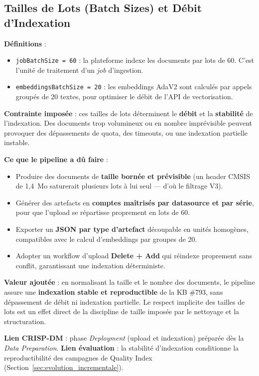 \documentclass[12pt,a4paper]{report}
\begin{document}
\subsection{Tailles de Lots (Batch Sizes) et Débit d'Indexation}
\label{sec:batch_sizes}

\textbf{Définitions} :
\begin{itemize}
  \item \texttt{jobBatchSize = 60} : la plateforme indexe les documents par lots de 60. C'est l'unité de traitement d'un \textit{job} d'ingestion.
  \item \texttt{embeddingsBatchSize = 20} : les embeddings AdaV2 sont calculés par appels groupés de 20 textes, pour optimiser le débit de l'API de vectorisation.
\end{itemize}

\textbf{Contrainte imposée} : ces tailles de lots déterminent le \textbf{débit} et la \textbf{stabilité} de l'indexation. Des documents trop volumineux ou en nombre imprévisible peuvent provoquer des dépassements de quota, des timeouts, ou une indexation partielle instable.

\textbf{Ce que le pipeline a dû faire} :
\begin{itemize}
  \item Produire des documents de \textbf{taille bornée et prévisible} (un header CMSIS de 1,4~Mo saturerait plusieurs lots à lui seul --- d'où le filtrage V3).
  \item Générer des artefacts en \textbf{comptes maîtrisés par datasource et par série}, pour que l'upload se répartisse proprement en lots de 60.
  \item Exporter un \textbf{JSON par type d'artefact} découpable en unités homogènes, compatibles avec le calcul d'embeddings par groupes de 20.
  \item Adopter un workflow d'upload \textbf{Delete + Add} qui réindexe proprement sans conflit, garantissant une indexation déterministe.
\end{itemize}

\textbf{Valeur ajoutée} : en normalisant la taille et le nombre des documents, le pipeline assure une \textbf{indexation stable et reproductible} de la KB \#793, sans dépassement de débit ni indexation partielle. Le respect implicite des tailles de lots est un effet direct de la discipline de taille imposée par le nettoyage et la structuration.

\textbf{Lien CRISP-DM} : phase \textit{Deployment} (upload et indexation) préparée dès la \textit{Data Preparation}. \textbf{Lien évaluation} : la stabilité d'indexation conditionne la reproductibilité des campagnes de Quality Index (Section~\ref{sec:evolution_incrementale}).
\end{document}
